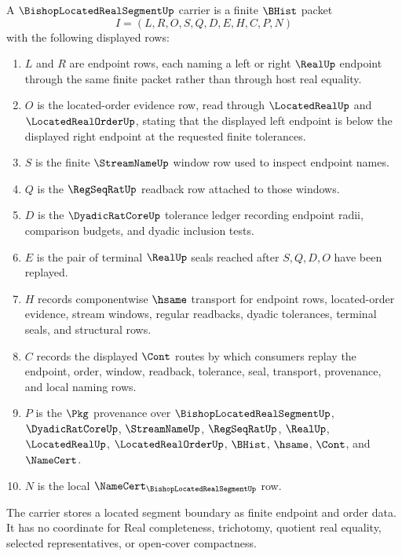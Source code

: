 \begin{definition}
\label{def:bishop-located-real-segment-carrier}
A $\BishopLocatedRealSegmentUp$ carrier is a finite $\BHist$ packet
$$
I=(L,R,O,S,Q,D,E,H,C,P,N)
$$
with the following displayed rows:
\begin{enumerate}
\item $L$ and $R$ are endpoint rows, each naming a left or right $\RealUp$ endpoint through the same finite packet rather than through host real equality.
\item $O$ is the located-order evidence row, read through $\LocatedRealUp$ and $\LocatedRealOrderUp$, stating that the displayed left endpoint is below the displayed right endpoint at the requested finite tolerances.
\item $S$ is the finite $\StreamNameUp$ window row used to inspect endpoint names.
\item $Q$ is the $\RegSeqRatUp$ readback row attached to those windows.
\item $D$ is the $\DyadicRatCoreUp$ tolerance ledger recording endpoint radii, comparison budgets, and dyadic inclusion tests.
\item $E$ is the pair of terminal $\RealUp$ seals reached after $S,Q,D,O$ have been replayed.
\item $H$ records componentwise $\hsame$ transport for endpoint rows, located-order evidence, stream windows, regular readbacks, dyadic tolerances, terminal seals, and structural rows.
\item $C$ records the displayed $\Cont$ routes by which consumers replay the endpoint, order, window, readback, tolerance, seal, transport, provenance, and local naming rows.
\item $P$ is the $\Pkg$ provenance over $\BishopLocatedRealSegmentUp$, $\DyadicRatCoreUp$, $\StreamNameUp$, $\RegSeqRatUp$, $\RealUp$, $\LocatedRealUp$, $\LocatedRealOrderUp$, $\BHist$, $\hsame$, $\Cont$, and $\NameCert$.
\item $N$ is the local $\NameCert_{\BishopLocatedRealSegmentUp}$ row.
\end{enumerate}
The carrier stores a located segment boundary as finite endpoint and order data. It has no coordinate for Real completeness, trichotomy, quotient real equality, selected representatives, or open-cover compactness.
\end{definition}

